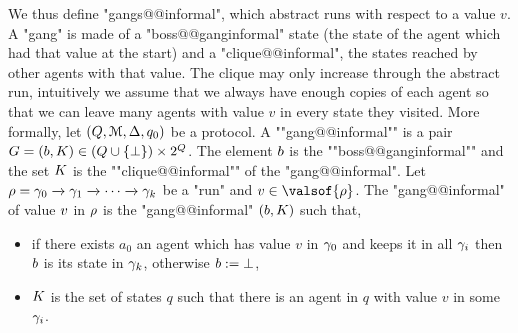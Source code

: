 	We thus define "gangs@@informal", which abstract runs with respect to a value $v$. A "gang" is made of a "boss@@ganginformal" state (the state of the agent which had that value at the start) and a "clique@@informal", the states reached by other agents with that value. The clique may only increase through the abstract run, intuitively we assume that we always have enough copies of each agent so that we can leave many agents with value $v$ in every state they visited.
	\AP More formally, let $(Q,\mathcal{M}, \Delta, q_0)$ be a protocol.
	A ""gang@@informal"" is a pair $\gang = (\boss, \clique) \in (Q \cup \set{\noboss}) \times \powerset{Q}$. The element $\boss$ is the ""boss@@ganginformal"" and the set $\clique$ is the ""clique@@informal"" of the "gang@@informal". 	
	Let $\rho = \gamma_0 \xrightarrow{} \gamma_1 \xrightarrow{} \cdots \xrightarrow{} \gamma_k$ be a "run" and $\aval \in \valsof{\run}$. The "gang@@informal" of value $v$ in $\rho$ is the "gang@@informal" $(\boss, \clique)$ such that, 
	\begin{itemize}
		\item if there exists $a_0$ an agent which has value $v$ in $\gamma_0$ and keeps it in all $\gamma_i$ then $\boss$ is its state in $\gamma_k$, otherwise $\boss := \noboss$, 
		\item  $\clique$ is the set of states $q$ such that there is an agent in $q$ with value $v$ in some $\gamma_i$.
	\end{itemize}
	




